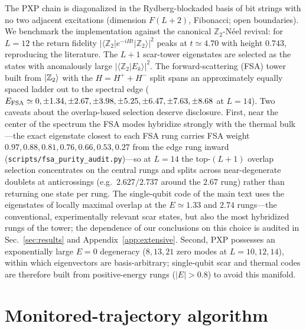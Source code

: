 \documentclass[a4paper,11pt,twocolumn,unpublished]{quantumarticle}
\newcommand{\Ztwo}{\mathbb{Z}_2}
\begin{document}
The PXP chain is diagonalized in the Rydberg-blockaded basis of bit strings with
no two adjacent excitations (dimension $F(L{+}2)$, Fibonacci; open boundaries).
We benchmark the implementation against the canonical $\Ztwo$-N\'eel revival:
for $L=12$ the return fidelity $|\langle\Ztwo|e^{-iHt}|\Ztwo\rangle|^2$ peaks at
$t\simeq4.70$ with height $0.743$, reproducing the literature. The $L{+}1$
scar-tower eigenstates are selected as the states with anomalously large
$|\langle\Ztwo|E_k\rangle|^2$. The forward-scattering (FSA) tower built from
$\ket{\Ztwo}$ with the $H=H^++H^-$ split spans an approximately equally
spaced ladder out to the spectral edge ($E_{\rm FSA}\simeq0,\pm1.34,\pm2.67,
\pm3.98,\pm5.25,\pm6.47,\pm7.63,\pm8.68$ at $L=14$). Two caveats about the
overlap-based selection deserve disclosure. First, near the center of the
spectrum the FSA modes hybridize strongly with the thermal bulk---the exact
eigenstate closest to each FSA rung carries FSA weight
$0.97,0.88,0.81,0.76,0.66,0.53,0.27$ from the edge rung inward
(\texttt{scripts/fsa\_purity\_audit.py})---so at $L=14$ the top-$(L{+}1)$
overlap selection concentrates on the central rungs and splits across
near-degenerate doublets at anticrossings (e.g.\ $2.627/2.737$ around the
$2.67$ rung) rather than returning one state per rung. The single-qubit code
of the main text uses the eigenstates of locally maximal overlap at the
$E\simeq1.33$ and $2.74$ rungs---the conventional, experimentally relevant
scar states, but also the most hybridized rungs of the tower; the dependence
of our conclusions on this choice is audited in
Sec.~\ref{sec:results} and Appendix~\ref{app:extensive}. Second, PXP
possesses an exponentially large $E=0$ degeneracy ($8,13,21$ zero modes at
$L=10,12,14$), within which eigenvectors are basis-arbitrary; single-qubit
scar and thermal codes are therefore built from positive-energy rungs
($|E|>0.8$) to avoid this manifold.

\section{Monitored-trajectory algorithm}
\label{app:algorithm}
\end{document}

